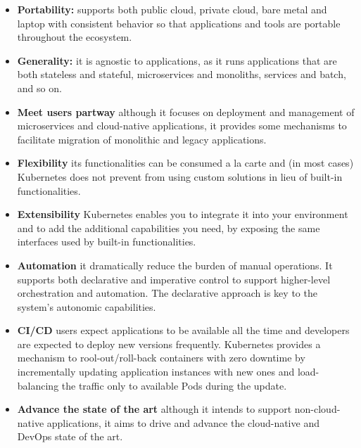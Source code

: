 \begin{itemize}
	
	\item \textbf{Portability:} supports both public cloud, private cloud, bare metal and laptop with consistent behavior so that applications and tools are portable throughout the ecosystem.
	
	\item \textbf{Generality:} it is agnostic to applications, as it runs applications that are both stateless and stateful, microservices and monoliths, services and batch, and so on.
	
	\item \textbf{Meet users partway} although it focuses on deployment and management of microservices and cloud-native applications, it provides some mechanisms to facilitate migration of monolithic and legacy applications.
	
	\item \textbf{Flexibility} its functionalities can be consumed a la carte and (in most cases) Kubernetes does not prevent from using custom solutions in lieu of built-in functionalities.
	
	\item \textbf{Extensibility} Kubernetes enables you to integrate it into your environment and to add the additional capabilities you need, by exposing the same interfaces used by built-in functionalities.
	
	\item \textbf{Automation} it dramatically reduce the burden of manual operations. It supports both declarative and imperative control to support higher-level orchestration and automation. The declarative approach is key to the system’s autonomic capabilities.
	
	\item \textbf{CI/CD} users expect applications to be available all the time and developers are expected to deploy new versions frequently.
	Kubernetes provides a mechanism to rool-out/roll-back containers with zero downtime by incrementally updating application instances with new ones and load-balancing the traffic only to available Pods during the update.
	
	\item \textbf{Advance the state of the art} although it intends to support non-cloud-native applications, it aims to drive and advance the cloud-native and DevOps state of the art.
	
\end{itemize}




